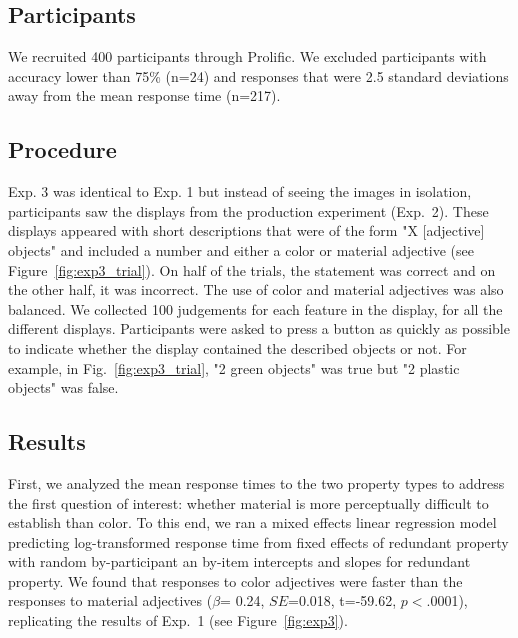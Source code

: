 \documentclass[12pt,letterpaper]{article}
\newcommand{\jd}[1]{\textcolor{Red}{[jd: #1]}}
\begin{document}
\subsection{Participants} 

We recruited 400 participants through Prolific. We excluded participants with accuracy lower than 75\% (n=24) and responses that were 2.5 standard deviations away from the mean response time (n=217).
\subsection{Procedure} 

Exp. 3 was identical to Exp. 1 but instead of seeing the images in isolation, participants saw the displays from the production experiment (Exp.~2). These displays appeared with short descriptions that were of the form "X [adjective] objects" and included a number and either a color or material adjective (see Figure~\ref{fig:exp3_trial}). On half of the trials, the statement was correct and on the other half, it was incorrect. The use of color and material adjectives was also balanced. We collected 100 judgements for each feature in the display, for all the different displays. Participants were asked to press a button as quickly as possible to indicate whether the display contained the described objects or not. For example, in Fig.~\ref{fig:exp3_trial}, "2 green objects" was true but "2 plastic objects" was false.

\subsection{Results} 

First, we analyzed the mean response times to the two property types to address the first question of interest: whether material is more perceptually difficult to establish than color. To this end, we ran a mixed effects linear regression model predicting log-transformed response time from fixed effects of redundant property with random by-participant an by-item intercepts and slopes for redundant property. We found that responses to color adjectives were faster than the responses to material adjectives ($\beta$= 0.24, $SE$=0.018, t=-59.62, $p$$<$.0001), replicating the results of Exp.~1 (see Figure~\ref{fig:exp3}). 
\end{document}
